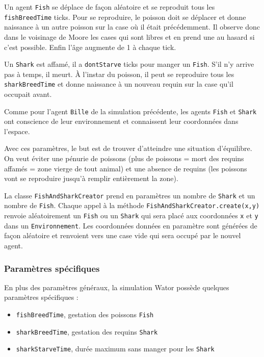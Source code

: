 \documentclass[a4paper]{article}
\begin{document}
\medskip
Un agent \texttt{Fish} se déplace de façon aléatoire et se reproduit tous les \texttt{fishBreedTime} ticks. Pour se reproduire, le poisson doit se déplacer et donne naissance à un autre poisson sur la case où il était précédemment. Il observe donc dans le voisinage de Moore les cases qui sont libres et en prend une au hasard si c'est possible. Enfin l'âge augmente de 1 à chaque tick.

\medskip
Un \texttt{Shark} est affamé, il a \texttt{dontStarve} ticks pour manger un \texttt{Fish}. S'il n'y arrive pas à temps, il meurt. À l'instar du poisson, il peut se reproduire tous les \texttt{sharkBreedTime} et donne naissance à un nouveau requin sur la case qu'il occupait avant.

\medskip
Comme pour l'agent \texttt{Bille} de la simulation précédente, les agents \texttt{Fish} et \texttt{Shark} ont conscience de leur environnement et connaissent leur coordonnées dans l'espace.

\medskip
Avec ces paramètres, le but est de trouver d'atteindre une situation d'équilibre. On veut éviter une pénurie de poissons (plus de poissons = mort des requins affamés = zone vierge de tout animal) et une absence de requins (les poissons vont se reproduire jusqu'à remplir entièrement la zone).

\medskip
La classe \texttt{FishAndSharkCreator} prend en paramètres un nombre de \texttt{Shark} et un nombre de \texttt{Fish}. Chaque appel à la méthode \texttt{FishAndSharkCreator.create(x,y)} renvoie aléatoirement un \texttt{Fish} ou un \texttt{Shark} qui sera placé aux coordonnées \texttt{x} et \texttt{y} dans un \texttt{Environnement}. Les coordonnées données en paramètre sont générées de façon aléatoire et renvoient vers une case vide qui sera occupé par le nouvel agent.
 
\subsubsection{Paramètres spécifiques}

En plus des paramètres généraux, la simulation Wator possède quelques paramètres spécifiques : 
\begin{itemize}
\item \texttt{fishBreedTime}, gestation des poissons \texttt{Fish}
\item \texttt{sharkBreedTime}, gestation des requins \texttt{Shark}
\item \texttt{sharkStarveTime}, durée maximum sans manger pour les \texttt{Shark}
\end{itemize}
\newpage
\end{document}
